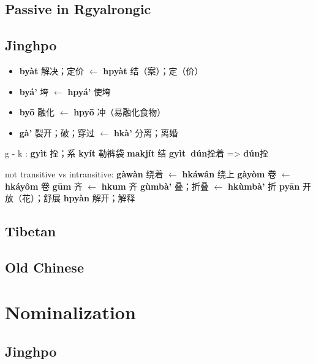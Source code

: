 \documentclass[oneside,a4paper,11pt]{article}
\newcommand{\ipa}[1]{\textbf{{\phon\mbox{#1}}}} %
\newcommand{\zh}[1]{{\cn #1}}
\begin{document}
\subsection{Passive in Rgyalrongic}
 
 
 \subsection{Jinghpo}
 \citet[78]{dai92yufa}
\begin{itemize}
\item \ipa{byàt} \zh{解决；定价} $\leftarrow$ \ipa{hpyàt} \zh{结（案）；定（价）}
\item \ipa{byá'} \zh{垮} $\leftarrow$ \ipa{hpyá'} \zh{使垮} %
\item \ipa{byō} \zh{融化} $\leftarrow$ \ipa{hpyō} \zh{冲（易融化食物）} 
\item \ipa{gà'} \zh{裂开；破；穿过} $\leftarrow$ \ipa{hkà'} \zh{分离；离婚} 
\end{itemize}

g - k : 
  \ipa{gyìt} \zh{拴；系}  \ipa{kyít}   \zh{勒裤袋}
  \ipa{makjít} \zh{结} 
    \ipa{gyìt dún}\zh{拴着} =>  \ipa{dún}\zh{拴}

not transitive vs intransitive:
 \ipa{gàwàn} \zh{绕着} $\leftarrow$ \ipa{hkáwân} \zh{绕上} %
 \ipa{gàyòm} \zh{卷} $\leftarrow$ \ipa{hkáyôm} \zh{卷} %
 \ipa{gūm} \zh{齐} $\leftarrow$ \ipa{hkum} \zh{齐} %
  \ipa{gùmbà'} \zh{叠；折叠} $\leftarrow$ \ipa{hkùmbà'} \zh{折} 
\ipa{pyān} \zh{开放（花）；舒展}  \ipa{hpyàn} \zh{解开；解释} %

\subsection{Tibetan}
\subsection{Old Chinese}
\section{Nominalization}
\subsection{Jinghpo}
\end{document}
